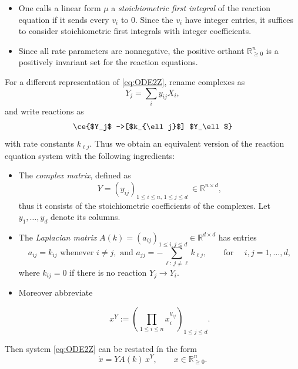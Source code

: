 \documentclass{article}
\begin{document}
\begin{itemize}
\begin{equation}
\end{equation}
To determine the time evolution of a reaction network, add up all the individual reaction terms on the right hand side. This {\em reaction equation system} therefore has the form
\begin{equation}\label{eq:ODE2Z}
    \dot x=\sum k_i\varphi_i(x)\,v_i.
\end{equation}
\item One calls a linear form $\mu$ a {\em stoichiometric first integral} of the reaction equation if it sends every $v_i$ to $0$. Since the $v_i$ have integer entries, it suffices to consider stoichiometric first integrals with integer coefficients.
\item Since all rate parameters are nonnegative, the positive orthant $\mathbb R_{\geq 0}^n$ is a positively invariant set for the reaction equations.
\end{itemize}
For a different representation of \eqref{eq:ODE2Z}, rename complexes as 
\[
Y_j=\sum_i y_{ij}X_i, 
\]
and write reactions as
\[
\ce{$Y_j$  ->[$k_{\ell j}$] $Y_\ell$}
\]
with rate constants $k_{\ell j}$.
Thus we obtain an equivalent version of the reaction equation system with the following ingredients:
\begin{itemize}
\item The \emph{complex matrix}, defined as
\begin{equation*}\label{massacmat}
Y=\left(y_{ij}\right)_{1\le i\le n,\, 1\le j\le d} \ \in \mathbb R^{n\times d}, 
\end{equation*}
thus it consists  of the stoichiometric coefficients of the complexes. Let $y_1,\dots,y_d$ denote its columns. 
\item The \emph{Laplacian matrix} { $A(k) = (a_{ij})_{1\le i,j\le d}\in \mathbb R^{d\times d}$}  has entries
\[ a_{ij} =k_{ij} \text{  whenever  } i\neq j,  \text{  and  }a_{jj} = -\sum_{\ell:\,j\neq \ell} {k_{\ell j}},\qquad \textrm{for }\quad i,j=1,\ldots,d, \]
where $k_{ij}=0$ if there is no reaction $Y_j\rightarrow Y_i$. 
\item Moreover abbreviate

\begin{equation*}
x^Y:=\left( \prod_{1\leq i\leq n} x_i^{y_{ij}}\right)_{1\leq j\leq d}.
\end{equation*}

\end{itemize}
Then system \eqref{eq:ODE2Z} can be restated ín the form
\begin{equation}\label{eq:ODE2A}
\dot{x}=  Y A(k)\,  x^Y, \qquad x\in \mathbb R^n_{\geq 0}.
\end{equation}
\end{document}
